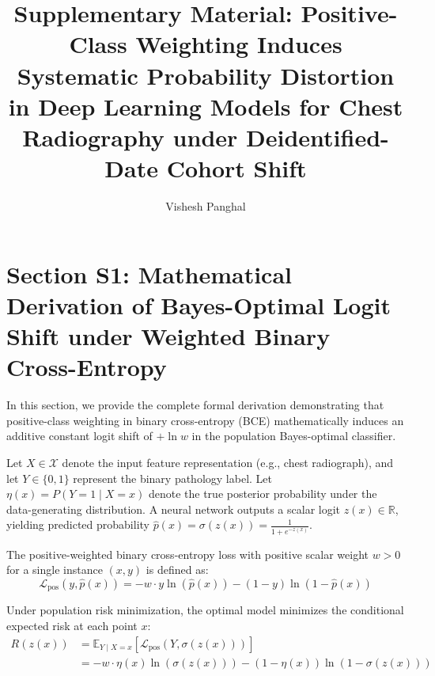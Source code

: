 \documentclass[preprint,12pt]{elsarticle}
\begin{document}
\begin{frontmatter}

\title{Supplementary Material: Positive-Class Weighting Induces Systematic Probability Distortion in Deep Learning Models for Chest Radiography under Deidentified-Date Cohort Shift}

\author{Vishesh Panghal}


\end{frontmatter}

\renewcommand{\thetable}{S\arabic{table}}
\renewcommand{\thefigure}{S\arabic{figure}}
\setcounter{table}{0}
\setcounter{figure}{0}

\section*{Section S1: Mathematical Derivation of Bayes-Optimal Logit Shift under Weighted Binary Cross-Entropy}
In this section, we provide the complete formal derivation demonstrating that positive-class weighting in binary cross-entropy (BCE) mathematically induces an additive constant logit shift of $+\ln w$ in the population Bayes-optimal classifier.

Let $X \in \mathcal{X}$ denote the input feature representation (e.g., chest radiograph), and let $Y \in \{0, 1\}$ represent the binary pathology label. Let $\eta(x) = P(Y = 1 \mid X = x)$ denote the true posterior probability under the data-generating distribution. A neural network outputs a scalar logit $z(x) \in \mathbb{R}$, yielding predicted probability $\hat{p}(x) = \sigma(z(x)) = \frac{1}{1 + e^{-z(x)}}$.

The positive-weighted binary cross-entropy loss with positive scalar weight $w > 0$ for a single instance $(x, y)$ is defined as:
\begin{equation}
\mathcal{L}_{\text{pos}}(y, \hat{p}(x)) = - w \cdot y \ln(\hat{p}(x)) - (1 - y) \ln(1 - \hat{p}(x))
\label{eq:supp_loss_def}
\end{equation}

Under population risk minimization, the optimal model minimizes the conditional expected risk at each point $x$:
\begin{align}
R(z(x)) &= \mathbb{E}_{Y \mid X=x} [\mathcal{L}_{\text{pos}}(Y, \sigma(z(x)))] \nonumber \\
&= - w \cdot \eta(x) \ln(\sigma(z(x))) - (1 - \eta(x)) \ln(1 - \sigma(z(x)))
\label{eq:supp_expected_risk}
\end{align}
\end{document}
